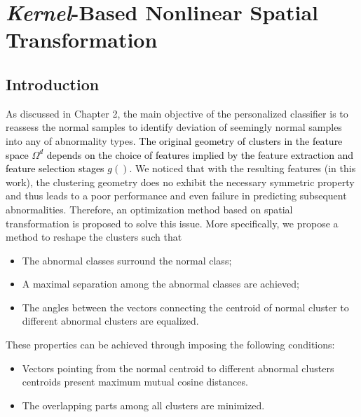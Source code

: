 \chapter{\textit{Kernel}-Based Nonlinear Spatial Transformation}\label{ch:spheremapping}
\section{Introduction}\label{sec:intro-kernel}

As discussed in Chapter 2, the main objective of the personalized classifier is to reassess the normal samples to identify deviation of seemingly normal samples into any of abnormality types. \textcolor{black}{The original geometry of clusters in the feature space $\Omega^d$ depends on the choice of features implied by the feature extraction and feature selection stages $g()$}. We noticed that with the resulting features (in this work), the clustering geometry does no exhibit the necessary symmetric property and thus leads to a poor performance and even failure in predicting subsequent abnormalities. 
Therefore, an optimization method based on spatial transformation is proposed to solve this issue. More specifically, we propose a method to reshape the clusters such that 
 \begin{itemize}
\item The abnormal classes surround the normal class; 
\item A maximal separation among the abnormal classes are achieved; 
\item The angles between the vectors connecting the centroid of normal cluster to different abnormal clusters are equalized. 
\end{itemize}

These properties can be achieved through imposing the following conditions:  
 \begin{itemize}
     \item Vectors pointing from the normal centroid to different abnormal clusters centroids present maximum mutual cosine distances.
     \item The overlapping parts among all clusters are minimized.
 \end{itemize}



